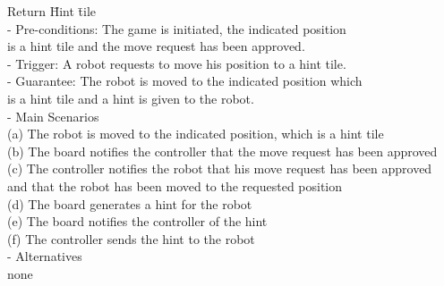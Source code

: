 {\footnotesize
\begin{tabbing}
Return \= Hint \= tile \\
- Pre-conditions: The game is initiated, the indicated position\\
\>is a hint tile and the move request has been approved.\\
- Trigger: A robot requests to move his position to a hint tile.\\
- Guarantee: The robot is moved to the indicated position which\\
\>is a hint tile and a hint is given to the robot.\\
- Main Scenarios\\
\>(a) The robot is moved to the indicated position, which is a hint tile\\
\>(b) The board notifies the controller that the move request has been approved\\
\>(c) The controller notifies the robot that his move request has been approved\\
\>\> and that the robot has been moved to the requested position\\
\>(d) The board generates a hint for the robot\\
\>(e) The board notifies the controller of the hint\\
\>(f) The controller sends the hint to the robot\\
- Alternatives\\
\>none\\
\end{tabbing}
}